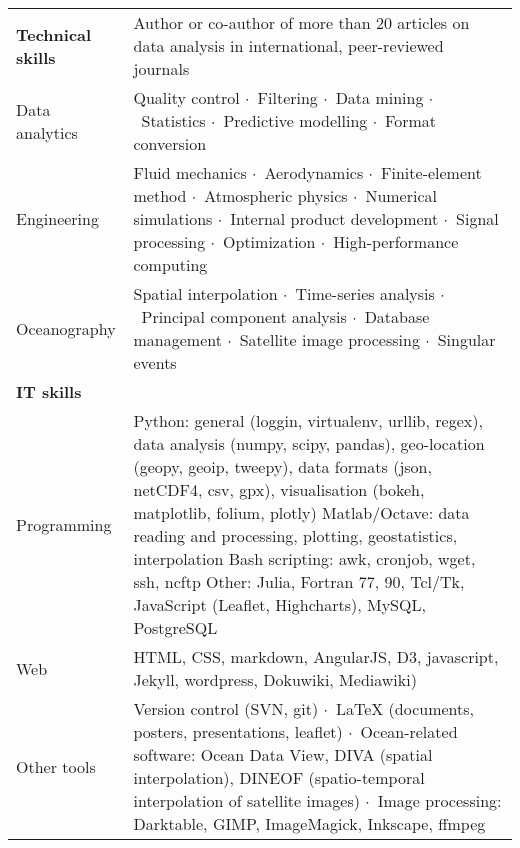 \documentclass[10pt,a4paper,svgnames]{article}
\newcommand{\sepa}{$\cdot$~}
\begin{document}
\begin{tabular}{p{}| p{}}

\textbf{Technical skills} & Author or co-author of more than 20 articles on data analysis in international, peer-reviewed journals\\
Data analytics & Quality control \sepa Filtering \sepa Data mining \sepa Statistics \sepa Predictive modelling \sepa Format conversion\\

Engineering & Fluid mechanics \sepa Aerodynamics \sepa Finite-element method \sepa Atmospheric physics \sepa Numerical simulations \sepa Internal product development \sepa Signal processing \sepa Optimization \sepa High-performance computing \\

Oceanography & Spatial interpolation \sepa Time-series analysis \sepa Principal component analysis \sepa Database management \sepa Satellite image processing \sepa Singular events \\

\textbf{IT skills} & \\

Programming & Python: general (loggin, virtualenv, urllib, regex), data analysis (numpy, scipy, pandas), geo-location (geopy, geoip, tweepy), data formats (json, netCDF4, csv, gpx), visualisation (bokeh, matplotlib, folium, plotly) 
\newline Matlab/Octave: data reading and processing, plotting, geostatistics, interpolation
\newline Bash scripting: awk, cronjob, wget, ssh, ncftp 
\newline Other: Julia, Fortran 77, 90, Tcl/Tk, JavaScript (Leaflet, Highcharts), MySQL, PostgreSQL\\
Web & HTML, CSS, markdown, AngularJS, D3, javascript, Jekyll, wordpress, Dokuwiki, Mediawiki)\\	
Other tools & Version control (SVN, git) \sepa LaTeX (documents, posters, presentations, leaflet) \sepa  Ocean-related software: Ocean Data View, DIVA (spatial interpolation), DINEOF (spatio-temporal interpolation of satellite images) \sepa Image processing: Darktable, GIMP, ImageMagick, Inkscape, ffmpeg\\


\end{tabular}
\end{document}
